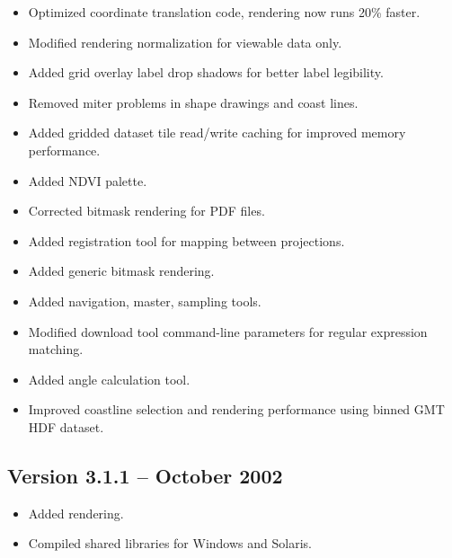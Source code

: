 \begin{itemize}

  \item Optimized coordinate translation code, rendering now runs 20\%
  faster.

  \item Modified rendering normalization for viewable data only.

  \item Added grid overlay label drop shadows for better label
  legibility.

  \item Removed miter problems in shape drawings and coast lines.

  \item Added gridded dataset tile read/write caching for improved
  memory performance.

  \item Added NDVI palette.

  \item Corrected bitmask rendering for PDF files.

  \item Added registration tool for mapping between projections.

  \item Added generic bitmask rendering.

  \item Added navigation, master, sampling tools.

  \item Modified download tool command-line parameters for regular
  expression matching.

  \item Added angle calculation tool.

  \item Improved coastline selection and rendering performance using
  binned GMT HDF dataset.

\end{itemize}


\subsection*{Version 3.1.1 -- October 2002}

\begin{itemize}

  \item Added rendering.

  \item Compiled shared libraries for Windows and Solaris.

\end{itemize}

